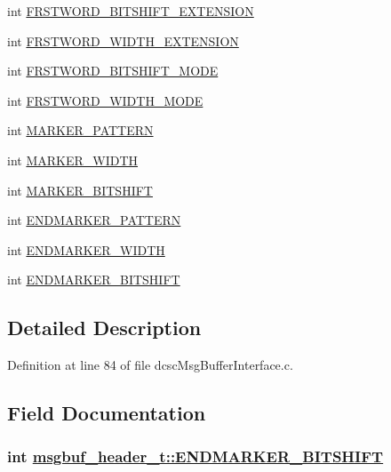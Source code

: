 \begin{CompactItemize}
\item 
int \hyperlink{structmsgbuf__header__t_533600b45879bd3ceca83f1f5441f7fb}{FRSTWORD\_\-BITSHIFT\_\-EXTENSION}
\item 
int \hyperlink{structmsgbuf__header__t_b43999f0c0b835ebe7e5543577e68ec9}{FRSTWORD\_\-WIDTH\_\-EXTENSION}
\item 
int \hyperlink{structmsgbuf__header__t_bbad9a4dd78f324a89fe53f5b32b18e8}{FRSTWORD\_\-BITSHIFT\_\-MODE}
\item 
int \hyperlink{structmsgbuf__header__t_427f985416682eb84096a402daf34442}{FRSTWORD\_\-WIDTH\_\-MODE}
\item 
int \hyperlink{structmsgbuf__header__t_4f6d9f143e2d0259908a2b7de3bac1b4}{MARKER\_\-PATTERN}
\item 
int \hyperlink{structmsgbuf__header__t_bb50392df1ee0c30073618c236a80174}{MARKER\_\-WIDTH}
\item 
int \hyperlink{structmsgbuf__header__t_ab81b6d9c5dfd815ff59e798ee070b0e}{MARKER\_\-BITSHIFT}
\item 
int \hyperlink{structmsgbuf__header__t_7d2334426b81bda2f4be01720f9d0e58}{ENDMARKER\_\-PATTERN}
\item 
int \hyperlink{structmsgbuf__header__t_e836817a10c51af80bd6602a6d064088}{ENDMARKER\_\-WIDTH}
\item 
int \hyperlink{structmsgbuf__header__t_ca71d6c38234c2bba52e1b6e80ef74a9}{ENDMARKER\_\-BITSHIFT}
\end{CompactItemize}


\subsection{Detailed Description}




Definition at line 84 of file dcsc\-Msg\-Buffer\-Interface.c.

\subsection{Field Documentation}
\hypertarget{structmsgbuf__header__t_ca71d6c38234c2bba52e1b6e80ef74a9}{
\subsubsection[ENDMARKER\_\-BITSHIFT]{\setlength{\rightskip}{0pt plus 5cm}int \hyperlink{structmsgbuf__header__t_ca71d6c38234c2bba52e1b6e80ef74a9}{msgbuf\_\-header\_\-t::ENDMARKER\_\-BITSHIFT}}}
\label{structmsgbuf__header__t_ca71d6c38234c2bba52e1b6e80ef74a9}




